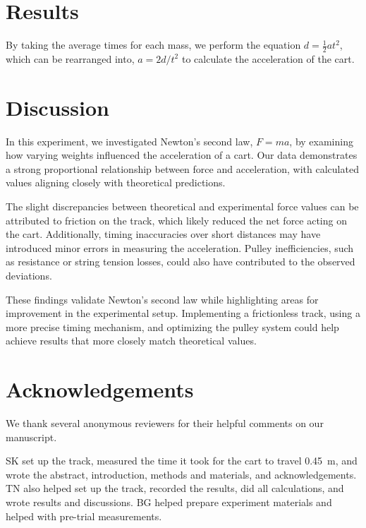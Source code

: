 ﻿\documentclass[reprint,amsmath,amssymb,aps]{revtex4-2}
\begin{document}
\section{Results}
By taking the average times for each mass, we perform the equation $d = \frac{1}{2} a t^2$, which can be rearranged into, $a=2d/t^2$ to calculate the acceleration of the cart.








\section{Discussion}
In this experiment, we investigated Newton’s second law, $F=ma$, by examining how varying weights influenced the acceleration of a cart. Our data demonstrates a strong proportional relationship between force and acceleration, with calculated values aligning closely with theoretical predictions.

The slight discrepancies between theoretical and experimental force values can be attributed to friction on the track, which likely reduced the net force acting on the cart. Additionally, timing inaccuracies over short distances may have introduced minor errors in measuring the acceleration. Pulley inefficiencies, such as resistance or string tension losses, could also have contributed to the observed deviations.

These findings validate Newton’s second law while highlighting areas for improvement in the experimental setup. Implementing a frictionless track, using a more precise timing mechanism, and optimizing the pulley system could help achieve results that more closely match theoretical values.




\section{Acknowledgements}
We thank several anonymous reviewers for their helpful comments on our manuscript. 

SK set up the track, measured the time it took for the cart to travel \qty{0.45}{\meter}, and wrote the abstract, introduction, methods and materials, and acknowledgements. TN also helped set up the track, recorded the results, did all calculations, and wrote results and discussions. BG helped prepare experiment materials and helped with pre-trial measurements. 





%

\end{document}
